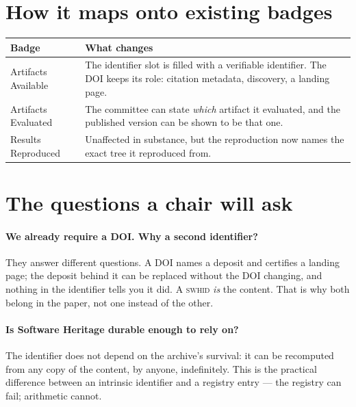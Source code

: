 \section{How it maps onto existing badges}

\begin{center}\small
\begin{tabular}{@{}>{\raggedright\arraybackslash}p{3.2cm}>{\raggedright\arraybackslash}p{9.6cm}@{}}
\toprule
\textbf{Badge} & \textbf{What changes} \\
\midrule
Artifacts Available & The identifier slot is filled with a verifiable identifier. The DOI keeps
its role: citation metadata, discovery, a landing page. \\
\addlinespace
Artifacts Evaluated & The committee can state \emph{which} artifact it evaluated, and the
published version can be shown to be that one. \\
\addlinespace
Results Reproduced & Unaffected in substance, but the reproduction now names the exact tree it
reproduced from. \\
\bottomrule
\end{tabular}
\end{center}

\section{The questions a chair will ask}

\paragraph{We already require a DOI. Why a second identifier?}
They answer different questions. A DOI names a deposit and certifies a landing page; the deposit
behind it can be replaced without the DOI changing, and nothing in the identifier tells you it
did. A \textsc{swhid} \emph{is} the content. That is why both belong in the paper, not one
instead of the other.

\paragraph{Is Software Heritage durable enough to rely on?}
The identifier does not depend on the archive's survival: it can be recomputed from any copy of
the content, by anyone, indefinitely. This is the practical difference between an intrinsic
identifier and a registry entry --- the registry can fail; arithmetic cannot.

